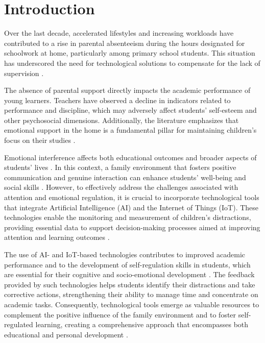 \section{Introduction}
Over the last decade, accelerated lifestyles and increasing workloads have contributed to a rise in parental absenteeism during the hours designated for schoolwork at home, particularly among primary school students. This situation has underscored the need for technological solutions to compensate for the lack of supervision \citep{Seidu2022Truancy,Ketsman2025Mapping}.

The absence of parental support directly impacts the academic performance of young learners. Teachers have observed a decline in indicators related to performance and discipline, which may adversely affect students’ self-esteem and other psychosocial dimensions. Additionally, the literature emphasizes that emotional support in the home is a fundamental pillar for maintaining children’s focus on their studies \citep{Seidu2022Truancy}.

Emotional interference affects both educational outcomes and broader aspects of students’ lives \citep{Ake2023}. In this context, a family environment that fosters positive communication and genuine interaction can enhance students’ well-being and social skills \citep{Navarro2024}. However, to effectively address the challenges associated with attention and emotional regulation, it is crucial to incorporate technological tools that integrate Artificial Intelligence (AI) and the Internet of Things (IoT). These technologies enable the monitoring and measurement of children's distractions, providing essential data to support decision-making processes aimed at improving attention and learning outcomes \citep{Alvear-Puertas2017,Berrezueta-Guzman2021}.

The use of AI- and IoT-based technologies contributes to improved academic performance and to the development of self-regulation skills in students, which are essential for their cognitive and socio-emotional development \citep{Mohamed2018Implementing}. The feedback provided by such technologies helps students identify their distractions and take corrective actions, strengthening their ability to manage time and concentrate on academic tasks. Consequently, technological tools emerge as valuable resources to complement the positive influence of the family environment and to foster self-regulated learning, creating a comprehensive approach that encompasses both educational and personal development \citep{Thinyane2016AUG}.

